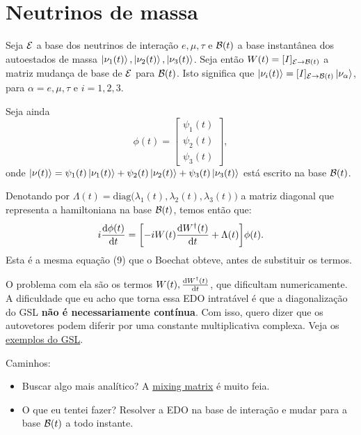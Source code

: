 \documentclass[a4paper,fleqn,12pt]{article}
\begin{document}
\section{Neutrinos de massa}

Seja $\mathcal{E}$ a base dos neutrinos de interação $e, \mu, \tau$ e $\mathcal{B}(t)$ a base instantânea dos autoestados de massa $\ket{\nu_1(t)}, \ket{\nu_2(t)}, \ket{\nu_3(t)}$. Seja então $W(t) = [ I ]_{\mathcal{E} \to \mathcal{B}(t)}$ a matriz mudança de base de $\mathcal{E}$ para $\mathcal{B}(t)$. Isto significa que $\ket{\nu_i(t)} = [ I ]_{\mathcal{E} \to \mathcal{B}(t)} \ket{\nu_\alpha}$, para $\alpha = e, \mu, \tau$ e $i = 1, 2, 3$.

Seja ainda
$$
\phi(t) =
\begin{bmatrix}
\psi_1(t) \\
\psi_2(t) \\
\psi_3(t)
\end{bmatrix},
$$
onde $\ket{\nu(t)} = \psi_1(t) \ket{\nu_1(t)} + \psi_2(t) \ket{\nu_2(t)} + \psi_3(t) \ket{\nu_3(t)}$ está escrito na base $\mathcal{B}(t)$.

Denotando por $\Lambda(t) = \text{diag}\Big(\lambda_1(t), \lambda_2(t), \lambda_3(t)\Big)$
a matriz diagonal que representa a hamiltoniana na base $\mathcal{B}(t)$, temos então que:
$$
i \dv{\phi(t)}{t} = \qty[ - i W(t) \dv{W^\dagger(t)}{t} + \Lambda(t) ] \phi(t).
$$
Esta é a mesma equação (9) que o Boechat obteve, antes de substituir os termos.

\n

O problema com ela são os termos $W(t), \dv{W^\dagger(t)}{t}$, que dificultam numericamente. A dificuldade que eu acho que torna essa EDO intratável é que a diagonalização do GSL \textbf{não é necessariamente contínua}. Com isso, quero dizer que os autovetores podem diferir por uma constante multiplicativa complexa. Veja os \href{https://www.gnu.org/software/gsl/doc/html/eigen.html#examples}{exemplos do GSL}.

\n

Caminhos:
\begin{itemize}
\item Buscar algo mais analítico? A \href{https://en.wikipedia.org/wiki/Pontecorvo%E2%80%93Maki%E2%80%93Nakagawa%E2%80%93Sakata_matrix}{mixing matrix} é muito feia.
\item O que eu tentei fazer? Resolver a EDO na base de interação e mudar para a base $\mathcal{B}(t)$ a todo instante.
\end{itemize}
\end{document}

